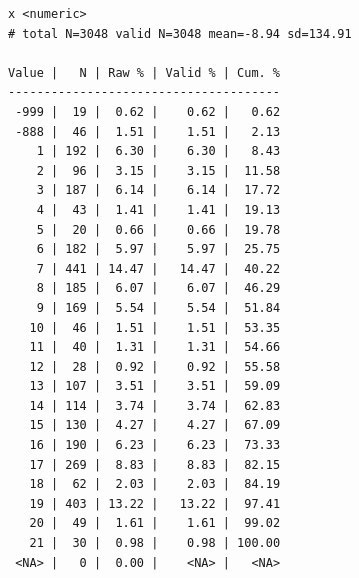 \documentclass[
  letterpaper,
  DIV=11,
  numbers=noendperiod]{scrreprt}
\newenvironment{Shaded}{\begin{snugshade}}{\end{snugshade}}
\newcommand{\CommentTok}[1]{\textcolor[rgb]{0.37,0.37,0.37}{#1}}
\newcommand{\DecValTok}[1]{\textcolor[rgb]{0.68,0.00,0.00}{#1}}
\newcommand{\FunctionTok}[1]{\textcolor[rgb]{0.28,0.35,0.67}{#1}}
\newcommand{\NormalTok}[1]{\textcolor[rgb]{0.00,0.23,0.31}{#1}}
\newcommand{\OtherTok}[1]{\textcolor[rgb]{0.00,0.23,0.31}{#1}}
\newcommand{\SpecialCharTok}[1]{\textcolor[rgb]{0.37,0.37,0.37}{#1}}
\begin{document}
\begin{Shaded}
\end{Shaded}

\begin{verbatim}
x <numeric> 
# total N=3048 valid N=3048 mean=-8.94 sd=134.91

Value |   N | Raw % | Valid % | Cum. %
--------------------------------------
 -999 |  19 |  0.62 |    0.62 |   0.62
 -888 |  46 |  1.51 |    1.51 |   2.13
    1 | 192 |  6.30 |    6.30 |   8.43
    2 |  96 |  3.15 |    3.15 |  11.58
    3 | 187 |  6.14 |    6.14 |  17.72
    4 |  43 |  1.41 |    1.41 |  19.13
    5 |  20 |  0.66 |    0.66 |  19.78
    6 | 182 |  5.97 |    5.97 |  25.75
    7 | 441 | 14.47 |   14.47 |  40.22
    8 | 185 |  6.07 |    6.07 |  46.29
    9 | 169 |  5.54 |    5.54 |  51.84
   10 |  46 |  1.51 |    1.51 |  53.35
   11 |  40 |  1.31 |    1.31 |  54.66
   12 |  28 |  0.92 |    0.92 |  55.58
   13 | 107 |  3.51 |    3.51 |  59.09
   14 | 114 |  3.74 |    3.74 |  62.83
   15 | 130 |  4.27 |    4.27 |  67.09
   16 | 190 |  6.23 |    6.23 |  73.33
   17 | 269 |  8.83 |    8.83 |  82.15
   18 |  62 |  2.03 |    2.03 |  84.19
   19 | 403 | 13.22 |   13.22 |  97.41
   20 |  49 |  1.61 |    1.61 |  99.02
   21 |  30 |  0.98 |    0.98 | 100.00
 <NA> |   0 |  0.00 |    <NA> |   <NA>
\end{verbatim}
\end{document}
